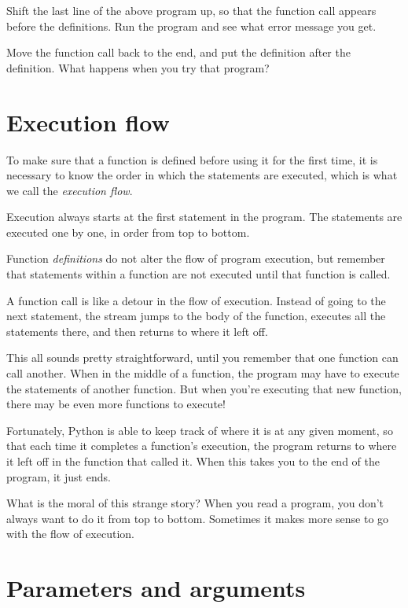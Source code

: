 Shift the last line of the above program up, so that the function call appears before the definitions. Run the program and see what error message you get.

Move the function call back to the end, and put the  definition after the  definition. What happens when you try that program?

\hypertarget{flujo-de-ejecuciuxf3n}{%
\section{Execution flow}\label{flujo-de-ejecuciuxf3n}}


To make sure that a function is defined before using it for the first time, it is necessary to know the order in which the statements are executed, which is what we call the \emph{execution flow}.

Execution always starts at the first statement in the program. The statements are executed one by one, in order from top to bottom.

Function \emph{definitions} do not alter the flow of program execution, but remember that statements within a function are not executed until that function is called.

A function call is like a detour in the flow of execution. Instead of going to the next statement, the stream jumps to the body of the function, executes all the statements there, and then returns to where it left off.

This all sounds pretty straightforward, until you remember that one function can call another. When in the middle of a function, the program may have to execute the statements of another function. But when you're executing that new function, there may be even more functions to execute!

Fortunately, Python is able to keep track of where it is at any given moment, so that each time it completes a function's execution, the program returns to where it left off in the function that called it. When this takes you to the end of the program, it just ends.

What is the moral of this strange story? When you read a program, you don't always want to do it from top to bottom. Sometimes it makes more sense to go with the flow of execution.

\hypertarget{paruxe1metros-y-argumentos}{%
\section{Parameters and arguments}\label{paruxe1metros-y-argumentos}}


